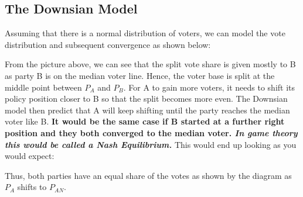 \documentclass[12pt, letterpaper]{article}
\begin{document}
\subsection{The Downsian Model}
Assuming that there is a normal distribution of voters, we can model the vote distribution and subsequent convergence as shown below:
\begin{center}
\end{center}

From the picture above, we can see that the split vote share is given mostly to B as party B is on the median voter line. Hence, the voter base is split at the middle point between $P_A$ and $P_B$. For A to gain more voters, it needs to shift its policy position closer to B so that the split becomes more even. The Downsian model then predict that A will keep shifting until the party reaches the median voter like B. \textbf{It would be the same case if B started at a further right position and they both converged to the median voter. \textit{In game theory this would be called a Nash Equilibrium.}} This would end up looking as you would expect:
\begin{center}
\end{center}

Thus, both parties have an equal share of the votes as shown by the diagram as $P_A$ shifts to $P_{AN}$.
\end{document}
